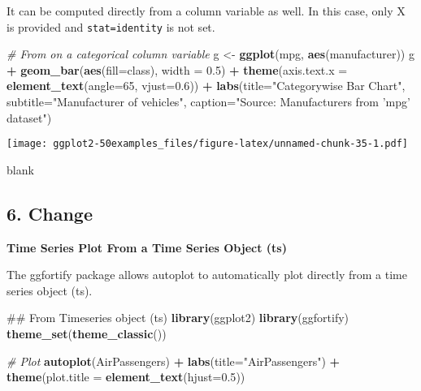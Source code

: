 \documentclass[a4paper]{article}
\newenvironment{Shaded}{\begin{snugshade}}{\end{snugshade}}
\newcommand{\KeywordTok}[1]{\textcolor[rgb]{0.13,0.29,0.53}{\textbf{#1}}}
\newcommand{\DataTypeTok}[1]{\textcolor[rgb]{0.13,0.29,0.53}{#1}}
\newcommand{\DecValTok}[1]{\textcolor[rgb]{0.00,0.00,0.81}{#1}}
\newcommand{\FloatTok}[1]{\textcolor[rgb]{0.00,0.00,0.81}{#1}}
\newcommand{\StringTok}[1]{\textcolor[rgb]{0.31,0.60,0.02}{#1}}
\newcommand{\CommentTok}[1]{\textcolor[rgb]{0.56,0.35,0.01}{\textit{#1}}}
\newcommand{\OperatorTok}[1]{\textcolor[rgb]{0.81,0.36,0.00}{\textbf{#1}}}
\newcommand{\NormalTok}[1]{#1}
\begin{document}
It can be computed directly from a column variable as well. In this
case, only X is provided and \texttt{stat=identity} is not set.

\begin{Shaded}
\begin{Highlighting}[]
\CommentTok{# From on a categorical column variable}
\NormalTok{g <-}\StringTok{ }\KeywordTok{ggplot}\NormalTok{(mpg, }\KeywordTok{aes}\NormalTok{(manufacturer))}
\NormalTok{g }\OperatorTok{+}\StringTok{ }\KeywordTok{geom_bar}\NormalTok{(}\KeywordTok{aes}\NormalTok{(}\DataTypeTok{fill=}\NormalTok{class), }\DataTypeTok{width =} \FloatTok{0.5}\NormalTok{) }\OperatorTok{+}\StringTok{ }
\StringTok{  }\KeywordTok{theme}\NormalTok{(}\DataTypeTok{axis.text.x =} \KeywordTok{element_text}\NormalTok{(}\DataTypeTok{angle=}\DecValTok{65}\NormalTok{, }\DataTypeTok{vjust=}\FloatTok{0.6}\NormalTok{)) }\OperatorTok{+}
\StringTok{  }\KeywordTok{labs}\NormalTok{(}\DataTypeTok{title=}\StringTok{"Categorywise Bar Chart"}\NormalTok{, }
       \DataTypeTok{subtitle=}\StringTok{"Manufacturer of vehicles"}\NormalTok{, }
       \DataTypeTok{caption=}\StringTok{"Source: Manufacturers from 'mpg' dataset"}\NormalTok{)}
\end{Highlighting}
\end{Shaded}

\texttt{[image: ggplot2-50examples\_files/figure-latex/unnamed-chunk-35-1.pdf]}

\newpage

blank

\newpage

\subsection{6. Change}\label{change}

\textbf{Time Series Plot From a Time Series Object (ts)}

The ggfortify package allows autoplot to automatically plot directly
from a time series object (ts).

\begin{Shaded}
\begin{Highlighting}[]
\NormalTok{## From Timeseries object (ts)}
\KeywordTok{library}\NormalTok{(ggplot2)}
\KeywordTok{library}\NormalTok{(ggfortify)}
\KeywordTok{theme_set}\NormalTok{(}\KeywordTok{theme_classic}\NormalTok{())}

\CommentTok{# Plot }
\KeywordTok{autoplot}\NormalTok{(AirPassengers) }\OperatorTok{+}\StringTok{ }
\StringTok{  }\KeywordTok{labs}\NormalTok{(}\DataTypeTok{title=}\StringTok{"AirPassengers"}\NormalTok{) }\OperatorTok{+}\StringTok{ }
\StringTok{  }\KeywordTok{theme}\NormalTok{(}\DataTypeTok{plot.title =} \KeywordTok{element_text}\NormalTok{(}\DataTypeTok{hjust=}\FloatTok{0.5}\NormalTok{))}
\end{Highlighting}
\end{Shaded}
\end{document}
